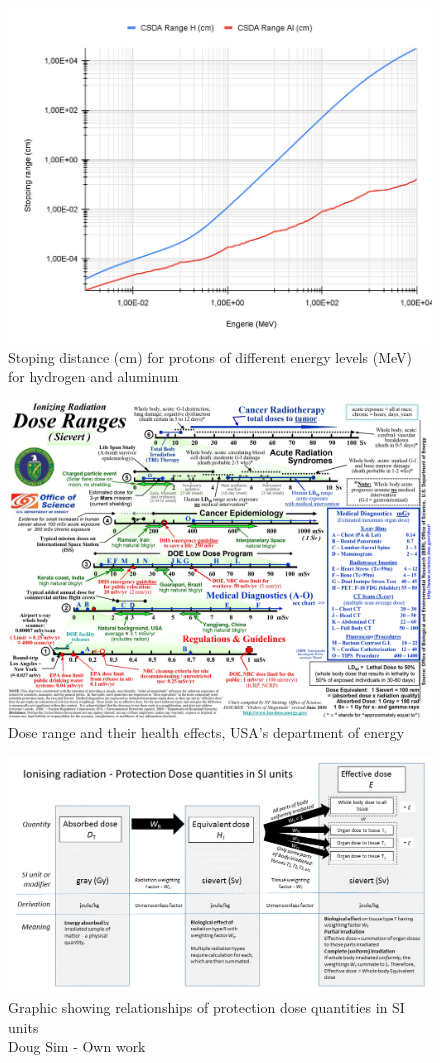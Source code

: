 \documentclass[12pt,a4paper]{report}
\begin{document}
\begin{figure}[hbtp]
\centering
\includegraphics[width=1\textwidth]{img/ranges.png}
\caption{Stoping distance (cm) for protons of different energy levels (MeV) for hydrogen and aluminum}
\end{figure}

\begin{figure}[hbtp]
\centering
\includegraphics[width=1\textwidth]{img/ML120970113_pages-to-jpg-0002.jpg}
\caption{Dose range and their health effects, USA's department of energy}
\end{figure}

\begin{figure}[hbtp]
\centering
\includegraphics[width=1\textwidth]{img/SI_Radiation_dose_units.png}
\caption{Graphic showing relationships of protection dose quantities in SI units\\
 Doug Sim - Own work}
\end{figure}
\end{document}
